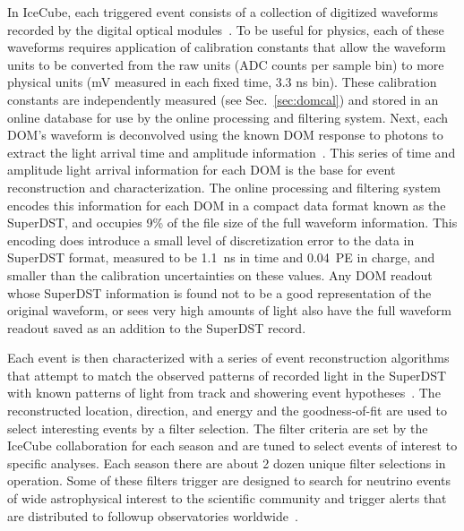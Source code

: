 In IceCube, each triggered event consists of a collection of digitized waveforms recorded by the digital optical modules~\cite{ref:domdaq}.
To be useful for physics, each of these waveforms requires application of calibration constants that allow the waveform units
to be converted from the raw units (ADC counts per sample bin) to more physical units (mV measured in each fixed time, 3.3 ns bin).  These
calibration constants are independently measured (see Sec.~\ref{sec:domcal}) and stored in an online database for use by
the online processing and filtering system.  Next, each DOM's waveform is deconvolved using the known DOM response
to photons to extract the light arrival time and amplitude information~\cite{IC3:ereco}.  
This series of time and amplitude light arrival information
for each DOM is the base for event reconstruction and characterization.  The online processing and filtering system encodes
this information for each DOM in a compact data format known as the SuperDST, and occupies 9\%  of the file size
of the full waveform information.  This encoding does introduce a small level of discretization error to the
data in SuperDST format, measured to be 1.1~ns in time and 0.04~PE in charge, and smaller than the calibration
uncertainties on these values.  Any DOM readout whose SuperDST information is found not to be a good representation of the
original waveform, or sees very high amounts of light also have the full waveform readout saved as an addition to the SuperDST record.


Each event is then characterized with a series of event reconstruction algorithms that attempt to match
the observed patterns of recorded light in the SuperDST with known patterns of light
from track and showering event hypotheses~\cite{IC3:ereco}.  The
reconstructed location, direction, and energy and the goodness-of-fit are used to select interesting
events by a filter selection.  The filter criteria are set by the IceCube collaboration for each season
and are tuned to select events of interest to specific analyses.  Each season there are
about 2 dozen unique filter selections in operation.  Some of these filters trigger are
designed to search for neutrino events of wide astrophysical interest to the scientific community and trigger
alerts that are distributed to followup observatories worldwide~\cite{Abbasi:2011ja,Aartsen:2015trq}.

